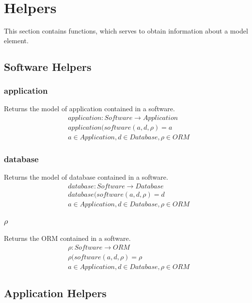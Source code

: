\documentclass[10pt]{article}
\begin{document}
\section{Helpers}
This section contains functions, which serves to obtain information about a model element.

\subsection{Software Helpers}
\subsubsection{application}
Returns the model of application contained in a software.
\begin{align}
& application : Software \rightarrow Application \\
& application(software(a, d, \rho) = a \\
& a \in Application, d \in Database, \rho \in ORM \nonumber  
\end{align}

\subsubsection{database}
Returns the model of database contained in a software.
\begin{align}
& database : Software \rightarrow Database \\
& database(software(a, d, \rho) = d \\
& a \in Application, d \in Database, \rho \in ORM \nonumber  
\end{align}

\subsubsection{$\rho$}
Returns the ORM contained in a software.
\begin{align}
& \rho : Software \rightarrow ORM \\
& \rho(software(a, d, \rho) = \rho \\
& a \in Application, d \in Database, \rho \in ORM \nonumber  
\end{align}

\subsection{Application Helpers}
\end{document}
